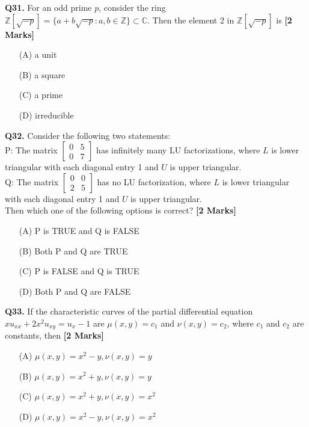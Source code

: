 \documentclass[11pt]{article}
\newcommand{\questionb}[2]{
    \noindent\textbf{Q#2.} #1 \hfill \textbf{[2 Marks]}
}
\begin{document}
\questionb{For an odd prime \( p \), consider the ring \( \mathbb{Z}[\sqrt{-p}] = \{a + b\sqrt{-p} : a, b \in \mathbb{Z}\} \subset \mathbb{C} \). Then the element 2 in \( \mathbb{Z}[\sqrt{-p}] \) is}{31}
\begin{enumerate}
    \item[(A)] a unit
    \item[(B)] a square
    \item[(C)] a prime
    \item[(D)] irreducible
\end{enumerate}
\vspace{0.5cm}

\questionb{Consider the following two statements: \\
P: The matrix \( \begin{bmatrix} 0 & 5 \\ 0 & 7 \end{bmatrix} \) has infinitely many LU factorizations, where \( L \) is lower triangular with each diagonal entry 1 and \( U \) is upper triangular. \\
Q: The matrix \( \begin{bmatrix} 0 & 0 \\ 2 & 5 \end{bmatrix} \) has no LU factorization, where \( L \) is lower triangular with each diagonal entry 1 and \( U \) is upper triangular. \\
Then which one of the following options is correct?}{32}
\begin{enumerate}
    \item[(A)] P is TRUE and Q is FALSE
    \item[(B)] Both P and Q are TRUE
    \item[(C)] P is FALSE and Q is TRUE
    \item[(D)] Both P and Q are FALSE
\end{enumerate}
\vspace{0.5cm}

\questionb{If the characteristic curves of the partial differential equation \( x u_{xx} + 2x^2 u_{xy} = u_x - 1 \) are \( \mu(x, y) = c_1 \) and \( \nu(x, y) = c_2 \), where \( c_1 \) and \( c_2 \) are constants, then}{33}
\begin{enumerate}
    \item[(A)] \( \mu(x, y) = x^2 - y, \nu(x, y) = y \)
    \item[(B)] \( \mu(x, y) = x^2 + y, \nu(x, y) = y \)
    \item[(C)] \( \mu(x, y) = x^2 + y, \nu(x, y) = x^2 \)
    \item[(D)] \( \mu(x, y) = x^2 - y, \nu(x, y) = x^2 \)
\end{enumerate}
\vspace{0.5cm}
\end{document}
